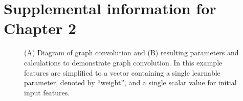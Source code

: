 \chapter{Supplemental information for Chapter 2}

\begin{figure}
    \centering
    \caption[Diagram of graph convolution]{(A) Diagram of graph convolution and (B) resulting parameters and calculations to demonstrate graph convolution. In this example features are simplified to a vector containing a single learnable parameter, denoted by “weight”, and a single scalar value for initial input features.}
    \label{fig:enter-label}
\end{figure}

